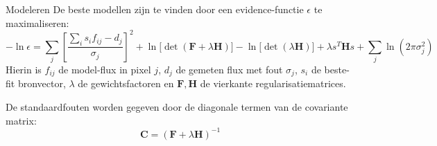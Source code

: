 \documentclass[aspectratio=169,xcolor=dvipsnames]{beamer}
\begin{document}
\begin{frame}{Modeleren}
    De beste modellen zijn te vinden door een evidence-functie \(\epsilon\) te maximaliseren:
    \[
    -\ln \epsilon = \sum_j \left[\frac{\sum_i s_i f_{ij} - d_j}{\sigma_j}\right]^2
    + \ln\!\bigl[\det(\bm F + \lambda  \bm H)\bigr]
    - \ln\!\bigl[\det(\lambda \bm H)\bigr]
    + \lambda s^{T} \bm H s
    + \sum_j \ln\!\left(2\pi \sigma_j^2\right)
    \]
    Hierin is $f_{ij}$ de model-flux in pixel $j$, $d_j$ de gemeten flux met fout $\sigma_j$, $s_i$ de beste-fit bronvector, $\lambda$ de gewichtsfactoren en $\mathbf{F}, \mathbf{H}$ de vierkante regularisatiematrices.

    \vspace{0.2cm}
    De standaardfouten worden gegeven door de diagonale termen van de covariante matrix:
    \[
    \bm C = (\bm F + \lambda \bm H)^{-1}
    \]

\end{frame}
\end{document}
